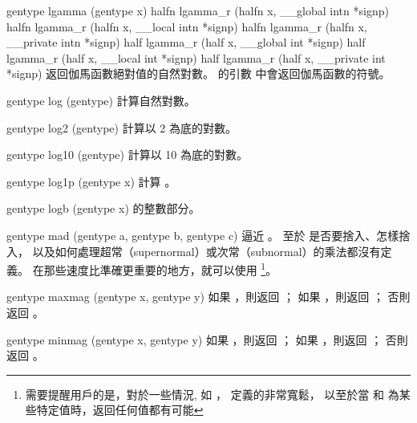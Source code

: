 gentype lgamma (gentype x)
halfn lgamma_r (halfn x,
	__global intn *signp)
halfn lgamma_r (halfn x,
	__local intn *signp)
halfn lgamma_r (halfn x,
	__private intn *signp)
half lgamma_r (half x,
	__global int *signp)
half lgamma_r (half x,
	__local int *signp)
half lgamma_r (half x,
	__private int *signp)
\stopbuffer
{}
返回伽馬函數絕對值的自然對數。
 的引數  中會返回伽馬函數的符號。
\stopbuffer

gentype log (gentype)
\stopbuffer
{}
計算自然對數。
\stopbuffer

gentype log2 (gentype)
\stopbuffer
{}
計算以 2 為底的對數。
\stopbuffer

gentype log10 (gentype)
\stopbuffer
{}
計算以 10 為底的對數。
\stopbuffer

gentype log1p (gentype x)
\stopbuffer
{}
計算 。
\stopbuffer

gentype logb (gentype x)
\stopbuffer
{}
的整數部分。
\stopbuffer

gentype mad (gentype a,
	gentype b,
	gentype c)
\stopbuffer
{}
 逼近 。
至於  是否要捨入、怎樣捨入，
以及如何處理超常（supernormal）或次常（subnormal）的乘法都沒有定義。
在那些速度比準確更重要的地方，就可以使用 \footnote{
需要提醒用戶的是，對於一些情況,
如 ，
 定義的非常寬鬆，
以至於當  和  為某些特定值時，返回任何值都有可能}。
\stopbuffer

gentype maxmag (gentype x, gentype y)
\stopbuffer
{}
如果 ，則返回 ；
如果 ，則返回 ；
否則返回 。
\stopbuffer

gentype minmag (gentype x, gentype y)
\stopbuffer
{}
如果 ，則返回 ；
如果 ，則返回 ；
否則返回 。
\stopbuffer

